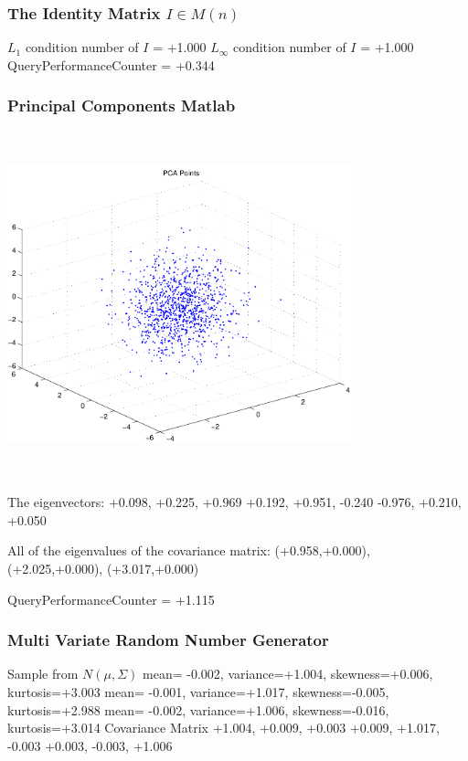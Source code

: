 \documentclass[9pt]{article}
\theoremstyle{plain}
\theoremstyle{definition}
\theoremstyle{remark}
\numberwithin{equation}{section}
\begin{document}
\subsubsection{The Identity Matrix $I \in M(n)$}
$L_1$ condition number of $I$ = +1.000
$L_\infty$ condition number of $I$ = +1.000
QueryPerformanceCounter  =  +0.344
\subsubsection{Principal Components Matlab }
\includegraphics[width=10.0cm,height=10.0cm]{PCAPoints.pdf}

The eigenvectors:
+0.098, +0.225, +0.969
+0.192, +0.951, -0.240
-0.976, +0.210, +0.050

All of the eigenvalues of the covariance matrix:
(+0.958,+0.000), (+2.025,+0.000), (+3.017,+0.000)

QueryPerformanceCounter  =  +1.115
\subsubsection{Multi Variate Random Number Generator }
Sample from $N(\mu,\Sigma)$
mean= -0.002, variance=+1.004, skewness=+0.006, kurtosis=+3.003
mean= -0.001, variance=+1.017, skewness=-0.005, kurtosis=+2.988
mean= -0.002, variance=+1.006, skewness=-0.016, kurtosis=+3.014
Covariance Matrix 
+1.004, +0.009, +0.003
+0.009, +1.017, -0.003
+0.003, -0.003, +1.006
\end{document}
